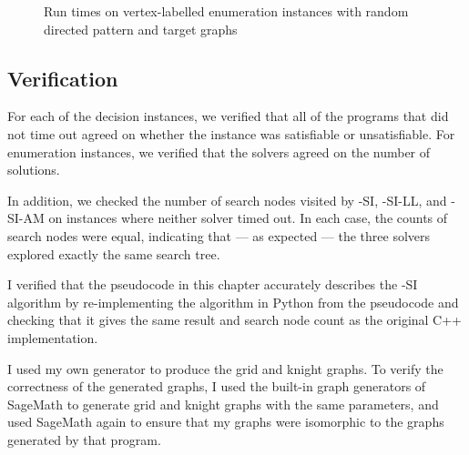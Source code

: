 \begin{figure}[htb]
    \centering
    \caption{Run times on vertex-labelled enumeration instances with random directed pattern and target graphs}
    \label{figure:labelled-vf-instance-runtimes}
\end{figure}

\FloatBarrier

\subsection{Verification}

For each of the decision instances, we verified that all of the programs that did not time out
agreed on whether the instance was satisfiable or unsatisfiable.  For enumeration instances,
we verified that the solvers agreed on the number of solutions.

In addition, we checked the number of search nodes visited by \McSplit-SI,
\McSplit-SI-LL, and \McSplit-SI-AM
on instances where neither solver timed out.  In each case, the counts of search nodes were equal,
indicating that --- as expected --- the three solvers explored exactly the same search tree.

I verified that the pseudocode in this chapter accurately describes the \McSplit-SI
algorithm by re-implementing the algorithm in Python from the pseudocode and checking
that it gives the same result and search node count as the original C++ implementation.

I used my own generator to produce the grid and knight graphs.  To verify the
correctness of the generated graphs, I used the built-in graph generators of
SageMath \citep{sagemath} to generate grid and knight graphs with the same
parameters, and used SageMath again to ensure that my graphs were isomorphic to
the graphs generated by that program.

